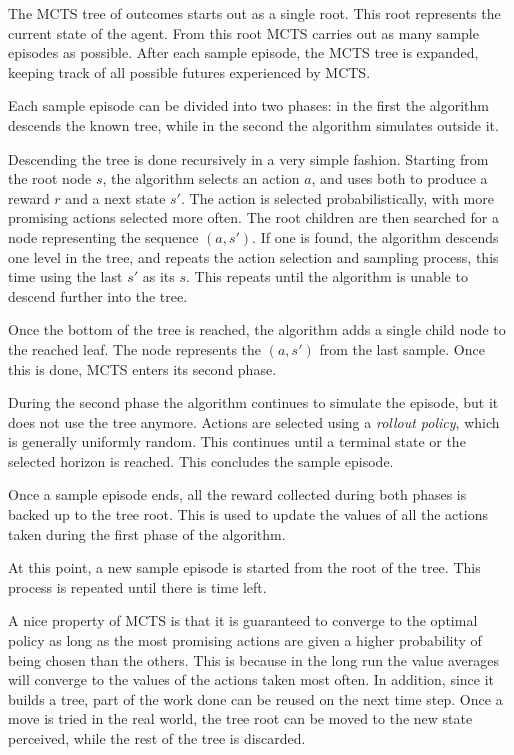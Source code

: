 The MCTS tree of outcomes starts out as a single root. This root represents the current state of the
agent. From this root MCTS carries out as many sample episodes as possible. After each sample
episode, the MCTS tree is expanded, keeping track of all possible futures experienced by MCTS.

Each sample episode can be divided into two phases: in the first the algorithm descends the
known tree, while in the second the algorithm simulates outside it.

Descending the tree is done recursively in a very simple fashion. Starting from the root node $s$, the
algorithm selects an action $a$, and uses both to produce a reward $r$ and a next state $s'$. The
action is selected probabilistically, with more promising actions selected more often.  The root
children are then searched for a node representing the sequence $(a,s')$. If one is found, the
algorithm descends one level in the tree, and repeats the action selection and sampling process,
this time using the last $s'$ as its $s$.  This repeats until the algorithm is unable to descend
further into the tree.

Once the bottom of the tree is reached, the algorithm adds a single child node to the reached leaf.
The node represents the $(a,s')$ from the last sample. Once this is done, MCTS enters its
second phase.

During the second phase the algorithm continues to simulate the episode, but it does not use the
tree anymore. Actions are selected using a \textit{rollout policy}, which is generally uniformly
random. This continues until a terminal state or the selected horizon is reached. This concludes the
sample episode.

Once a sample episode ends, all the reward collected during both phases is backed up to the tree
root. This is used to update the values of all the actions taken during the first phase of the
algorithm.

At this point, a new sample episode is started from the root of the tree. This process is repeated
until there is time left.

A nice property of MCTS is that it is guaranteed to converge to the optimal policy as long as the
most promising actions are given a higher probability of being chosen than the others. This is
because in the long run the value averages will converge to the values of the actions taken most
often.  In addition, since it builds a tree, part of the work done can be reused on the next time
step. Once a move is tried in the real world, the tree root can be moved to the new state perceived,
while the rest of the tree is discarded.

